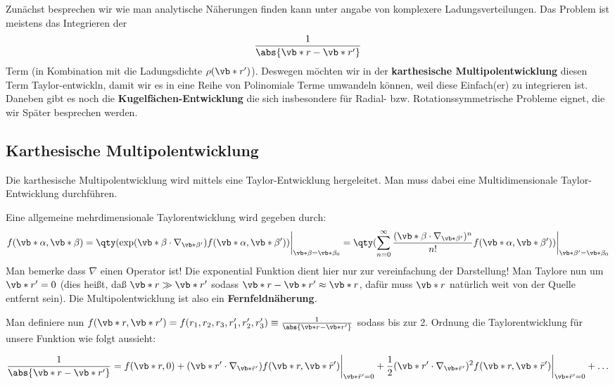 Zunächst besprechen wir wie man analytische Näherungen finden kann
unter angabe von komplexere Ladungsverteilungen. 
Das Problem ist meistens das Integrieren der
\begin{equation*}
  \frac{1}{\abs{\vb*r-\vb*r'}}
\end{equation*}
Term (in Kombination mit die Ladungsdichte $\rho(\vb*r')$). 
Deswegen möchten wir in der \textbf{karthesische Multipolentwicklung} 
diesen  Term Taylor-entwickln, damit wir es in eine 
Reihe von Polinomiale Terme umwandeln können, 
weil diese Einfach(er) zu integrieren ist. 
Daneben gibt es noch die \textbf{Kugelfächen-Entwicklung} die sich 
insbesondere für Radial- bzw. Rotationssymmetrische Probleme eignet, 
die wir Später besprechen werden. 

\subsection{Karthesische Multipolentwicklung}%
\label{ssub:Karthesische-Multipolentwicklung}
Die karthesische Multipolentwicklung wird mittels eine Taylor-Entwicklung
hergeleitet. Man muss dabei eine Multidimensionale Taylor-Entwicklung 
durchführen.

Eine allgemeine mehrdimensionale Taylorentwicklung wird gegeben durch:
\begin{equation*}
  f(\vb*\alpha, \vb*\beta)
  =\qty(\exp(\vb*\beta\cdot\nabla_{\vb*\beta'})
  f(\vb*\alpha, \vb*\beta'))
  \bigg|_{\vb*\beta=\vb*\beta_0}
  =\qty(\sum_{n=0}^\infty
  \frac{(\vb*\beta\cdot\nabla_{\vb*\beta'})^n}{n!}
  f(\vb*\alpha, \vb*\beta'))
  \bigg|_{\vb*\beta'=\vb*\beta_0}
\end{equation*}
Man bemerke dass $\nabla$ einen Operator ist! Die exponential Funktion
dient hier nur zur vereinfachung der Darstellung! Man Taylore nun um $\vb*r'=0$ (dies heißt, daß $\vb*r\gg\vb*r'$ sodass 
$\vb*r-\vb*r'\approx\vb*r$, dafür muss $\vb*r$ natürlich weit
von der Quelle entfernt sein). Die Multipolentwicklung ist also ein 
\textbf{Fernfeldnäherung}.

Man definiere nun $f(\vb*r,\vb*r')=f(r_1,r_2,r_3,r_1',r_2',r_3')
\equiv\frac{1}{\abs{\vb*r-\vb*r'}}$ sodass bis zur 2. Ordnung die Taylorentwicklung für unsere Funktion
wie folgt aussieht:

\begin{equation*}
  \frac{1}{\abs{\vb*r-\vb*r'}}=f(\vb*r, 0)
  + (\vb*r'\cdot \nabla_{\vb*{\bar{r}'}}) f(\vb*r, \vb*{\bar{r}}')\bigg|_{\vb*{\bar{r}}'=0}
  + \frac{1}{2}(\vb*r'\cdot\nabla_{\vb*{\bar r'}})^2
  f(\vb*r,\vb*{\bar r}')
  \bigg|_{\vb*{\bar r'}=0}
  + \ldots
\end{equation*}

